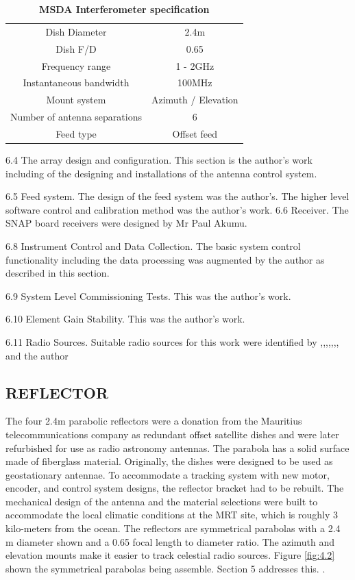 {\begin{table}[h!]
    \centering
\caption{\textbf{MSDA Interferometer specification}}
\begin{tabular}{ c   c}
    \hline
 Dish Diameter & 2.4m  \\ 
 Dish F/D & 0.65  \\  
 Frequency range & 1 - 2GHz \\
 Instantaneous bandwidth & 100MHz \\
 Mount system & Azimuth / Elevation\\
 Number of antenna separations & 6\\
 Feed type & Offset feed \\
 \hline
 \end{tabular}
    \label{tab:4.1}
\end{table}




6.4 The array design and configuration. This section is the author’s work including of the designing and installations of the antenna control  system.

6.5 Feed system. The design of the feed system was the author’s.  The higher level software control and calibration method was the author’s work.
6.6 Receiver. The SNAP board receivers were designed by Mr Paul Akumu.


6.8 Instrument Control and Data Collection. The basic system control functionality including the data processing was augmented by the author as
described in this section.

6.9 System Level Commissioning Tests. This was the author’s work.

6.10 Element Gain Stability. This was the author’s work.

6.11 Radio Sources. Suitable radio sources for this work were identified by
,,,,,,, and the author




\subsection{REFLECTOR}
The four 2.4m parabolic reflectors were a donation from the Mauritius telecommunications company as redundant offset satellite dishes and were later refurbished for use as radio astronomy antennas. The parabola has a solid surface made of fiberglass material. Originally, the dishes were designed to be used as geostationary antennae. To accommodate a tracking system with new motor, encoder, and control system designs, the reflector bracket had to be rebuilt. The mechanical design of the antenna and the material selections were built to accommodate the local climatic conditions at the MRT site, which is roughly 3 kilo-meters from the ocean.
The reflectors are symmetrical parabolas with a 2.4 m diameter shown and a 0.65 focal length to diameter ratio. The azimuth and elevation mounts make it easier to track celestial radio sources. Figure \ref{fig:4.2} shown the symmetrical parabolas being assemble.
Section 5 addresses this. . %

}
